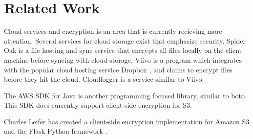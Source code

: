 
\section{Related Work}
Cloud services and encryption is an area that is currently recieving more attention. Several services for cloud storage exist that emphasize security. Spider Oak \cite{spideroak} is a file hosting and sync service that encrypts all files locally on the client machine before syncing with cloud storage. Viivo \cite{viivo} is a program which integrates with the popular cloud hosting service Dropbox \cite{dropbox}, and claims to encrypt files before they hit the cloud. Cloudfogger \cite{cloudfogger} is a service similar to Viivo.

The AWS SDK for Java \cite{aws-sdk-java} is another programming focused library, similar to boto. This SDK does currently support client-side encryption for S3.

Charles Leifer has created a client-side encryption implementation for Amazon S3 and the Flask Python framework \cite{flask}.
